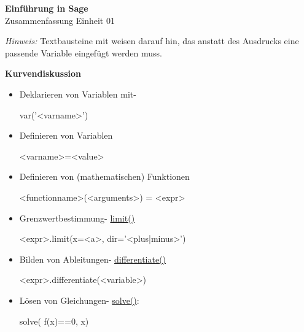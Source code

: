 \documentclass[a4paper,9pt,DIV15,twocolumn]{scrartcl}
\begin{document}
\begin{center}
    \textbf{\LARGE Einf\"uhrung in Sage}\\
    {\large Zusammenfassung Einheit 01}
\end{center}
\textsl{Hinweis:} Textbausteine mit  weisen darauf hin, das anstatt des Ausdrucks eine passende Variable eingefügt werden muss.

\medskip
\textbf{Kurvendiskussion}
\begin{itemize}
 \item Deklarieren von Variablen mit- \href{}{}
\begin{sagein}
var('<varname>')
\end{sagein}
\item Definieren von Variablen 
    \begin{sagein}
<varname>=<value>        
    \end{sagein}
\item Definieren von (mathematischen) Funktionen 
    \begin{sagein}
<functionname>(<arguments>) = <expr>
    \end{sagein}
\item Grenzwertbestimmung- \href{https://sage.math.uni-goettingen.de/doc/static/reference/sage/calculus/functional.html?highlight=function#sage.calculus.functional.limit}{limit()}
    \begin{sagein}
<expr>.limit(x=<a>, dir='<plus|minus>')
    \end{sagein}
\item Bilden von Ableitungen- \href{https://sage.math.uni-goettingen.de/doc/static/reference/sage/symbolic/expression.html?highlight=differentiate#sage.symbolic.expression.Expression.differentiate}{differentiate()}
\begin{sagein}
<expr>.differentiate(<variable>)
\end{sagein}

\item Lösen von Gleichungen- \href{https://sage.math.uni-goettingen.de/doc/static/reference/sage/symbolic/relation.html?highlight=symbolic.relation#sage.symbolic.relation.solve}{solve()}:
\begin{sagein}
solve( f(x)==0, x)
\end{sagein}


\end{itemize}
\end{document}
